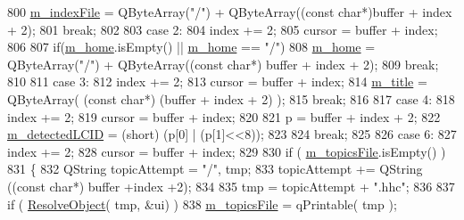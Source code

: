 \begin{DoxyCode}
800                     \hyperlink{classLCHMFileImpl_ab5f59c7a474b444bb07a1992bd0a6d82}{m\_indexFile} = QByteArray(\textcolor{stringliteral}{"/"}) + QByteArray((\textcolor{keyword}{const} \textcolor{keywordtype}{char}*)buffer + index + 2);
801                 \textcolor{keywordflow}{break};
802         
803             \textcolor{keywordflow}{case} 2:
804                 index += 2;
805                 cursor = buffer + index;
806                 
807                 \textcolor{keywordflow}{if}(\hyperlink{classLCHMFileImpl_a5bf6157ef7d4bc446c389eea871c09a0}{m\_home}.isEmpty() || \hyperlink{classLCHMFileImpl_a5bf6157ef7d4bc446c389eea871c09a0}{m\_home} == \textcolor{stringliteral}{"/"})
808                     \hyperlink{classLCHMFileImpl_a5bf6157ef7d4bc446c389eea871c09a0}{m\_home} = QByteArray(\textcolor{stringliteral}{"/"}) + QByteArray((\textcolor{keyword}{const} \textcolor{keywordtype}{char}*) buffer + index + 2);
809                 \textcolor{keywordflow}{break};
810             
811             \textcolor{keywordflow}{case} 3:
812                 index += 2;
813                 cursor = buffer + index;
814                 \hyperlink{classLCHMFileImpl_abe88f8991855d7d573bd2966f9fd9f8b}{m\_title} = QByteArray( (\textcolor{keyword}{const} \textcolor{keywordtype}{char}*) (buffer + index + 2) );
815                 \textcolor{keywordflow}{break};
816 
817             \textcolor{keywordflow}{case} 4:
818                 index += 2;
819                 cursor = buffer + index;
820 
821                 p = buffer + index + 2;
822                 \hyperlink{classLCHMFileImpl_a6d5c5705a3c148206aae29da01555ad1}{m\_detectedLCID} = (short) (p[0] | (p[1]<<8));
823             
824                 \textcolor{keywordflow}{break};
825 
826             \textcolor{keywordflow}{case} 6:
827                 index += 2;
828                 cursor = buffer + index;
829 
830                 \textcolor{keywordflow}{if} ( \hyperlink{classLCHMFileImpl_af3d33a88f44e3d103f08d9cc1c0ccf12}{m\_topicsFile}.isEmpty() )
831                 \{
832                     QString topicAttempt = \textcolor{stringliteral}{"/"}, tmp;
833                     topicAttempt += QString ((\textcolor{keyword}{const} \textcolor{keywordtype}{char}*) buffer +index +2);
834 
835                     tmp = topicAttempt + \textcolor{stringliteral}{".hhc"};
836                 
837                     \textcolor{keywordflow}{if} ( \hyperlink{classLCHMFileImpl_a78d3e549251cd4c842aecca5aa1ede36}{ResolveObject}( tmp, &ui) )
838                         \hyperlink{classLCHMFileImpl_af3d33a88f44e3d103f08d9cc1c0ccf12}{m\_topicsFile} = qPrintable( tmp );

\end{DoxyCode}
